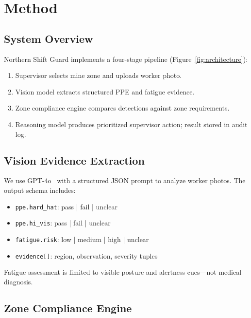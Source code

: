 \section{Method}
\label{sec:method}

\subsection{System Overview}

Northern Shift Guard implements a four-stage pipeline (Figure~\ref{fig:architecture}):

\begin{enumerate}
  \item Supervisor selects mine zone and uploads worker photo.
  \item Vision model extracts structured PPE and fatigue evidence.
  \item Zone compliance engine compares detections against zone requirements.
  \item Reasoning model produces prioritized supervisor action; result stored in audit log.
\end{enumerate}


\subsection{Vision Evidence Extraction}

We use GPT-4o~\cite{openai2024gpt4o} with a structured JSON prompt to analyze worker photos. The output schema includes:
\begin{itemize}
  \item \texttt{ppe.hard\_hat}: pass | fail | unclear
  \item \texttt{ppe.hi\_vis}: pass | fail | unclear
  \item \texttt{fatigue.risk}: low | medium | high | unclear
  \item \texttt{evidence[]}: region, observation, severity tuples
\end{itemize}

Fatigue assessment is limited to visible posture and alertness cues---not medical diagnosis.

\subsection{Zone Compliance Engine}

